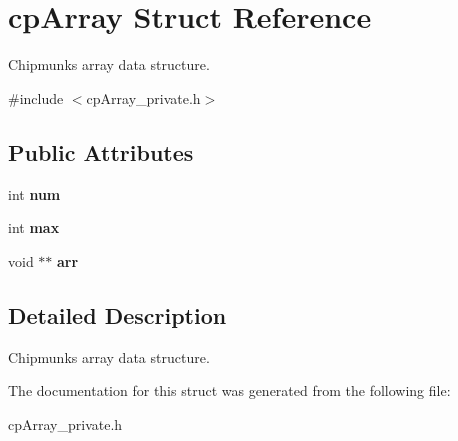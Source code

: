 \hypertarget{structcp_array}{}\section{cp\+Array Struct Reference}
\label{structcp_array}


Chipmunk\textquotesingle{}s array data structure.  




{\ttfamily \#include $<$cp\+Array\+\_\+private.\+h$>$}

\subsection*{Public Attributes}
\begin{DoxyCompactItemize}
\item 
\hypertarget{structcp_array_a7e4b3a68ae2f403be9cfdac83f1059e5}{}int {\bfseries num}\label{structcp_array_a7e4b3a68ae2f403be9cfdac83f1059e5}

\item 
\hypertarget{structcp_array_af716e2d8fd33cdb3278b123b6f5479e2}{}int {\bfseries max}\label{structcp_array_af716e2d8fd33cdb3278b123b6f5479e2}

\item 
\hypertarget{structcp_array_a2a69d85aa1cd455427b7df267d7d6ed5}{}void $\ast$$\ast$ {\bfseries arr}\label{structcp_array_a2a69d85aa1cd455427b7df267d7d6ed5}

\end{DoxyCompactItemize}


\subsection{Detailed Description}
Chipmunk\textquotesingle{}s array data structure. 

The documentation for this struct was generated from the following file\+:\begin{DoxyCompactItemize}
\item 
cp\+Array\+\_\+private.\+h\end{DoxyCompactItemize}
